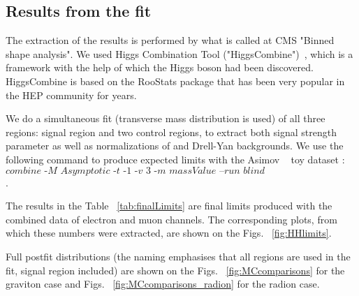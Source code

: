  
\subsection{Results from the fit}
The extraction of the results is performed by what is called at CMS "Binned shape analysis". We used Higgs Combination Tool ("HiggsCombine")~\cite{HiggsCombine}, which is a framework with the help of which the Higgs boson had been discovered. HiggsCombine is based on the RooStats package that has been very popular in the HEP community for years. 

We do a simultaneous fit (\mTHH transverse mass distribution is used) of all three
regions: signal region and two control regions, to extract both
signal strength parameter as well as normalizations of \ttbar and
Drell-Yan backgrounds. We use the following command to produce expected limits with the Asimov ~\cite{Cowan:2010js} toy dataset :  \hfill \break
$\textit{combine 
-M Asymptotic -t -1 -v 3 -m massValue --run blind
comb\_card\_massValue.txt}$.





The results in the Table ~\ref{tab:finalLimits} are final limits produced with the combined data of electron and muon channels. The corresponding plots, from which these numbers were extracted, are shown on the Figs. ~\ref{fig:HHlimits}. %

Full postfit distributions (the naming emphasises that all regions are used in the fit, signal region included) are shown on the Figs. ~\ref{fig:MCcomparisons} for the graviton case and Figs. ~\ref{fig:MCcomparisons_radion} for the radion case. 







